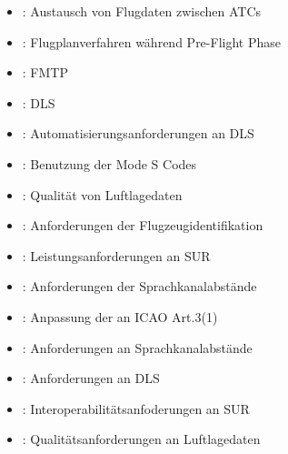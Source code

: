     \begin{itemize}
        \item {}:  Austausch von Flugdaten zwischen \acp{ATC} %
        \item {}:  Flugplanverfahren während Pre-Flight Phase %
        \item {}:   \acf{FMTP} %
        \item {}:    \acf{DLS} %
        \item {}:    Automatisierungsanforderungen an \ac{DLS} %
        \item {}:   Benutzung der Mode S Codes %
        \item {}:    Qualität von Luftlagedaten %
        \item {}:  Anforderungen der Flugzeugidentifikation %
        \item {}:  Leistungsanforderungen an \ac{SUR} %
        \item {}:  Anforderungen der Sprachkanalabstände %
        \item {}:   Anpassung der  an \acs{ICAO} Art.3(1)%
        \item {}:   Anforderungen an Sprachkanalabstände %
        \item {}:   Anforderungen an \acf{DLS} %
        \item {}:  Interoperabilitätsanfoderungen an \acs{SUR} %
        \item {}:  Qualitätsanforderungen an Luftlagedaten %

\end{itemize}
